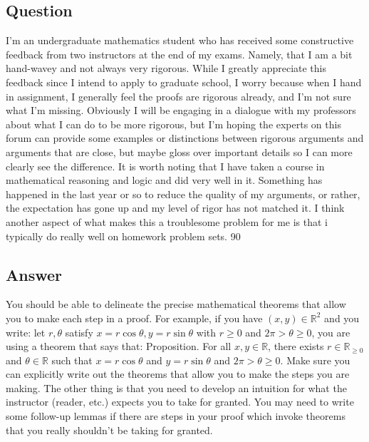 \documentclass{article}
\begin{document}
\subsection*{Question}
I'm an undergraduate mathematics student who has received some constructive feedback from two instructors at the end of my exams. Namely, that I am a bit hand-wavey and not always very rigorous. While I greatly appreciate this feedback since I intend to apply to graduate school, I worry because when I hand in assignment, I generally feel the proofs are rigorous already, and I'm not sure what I'm missing. Obviously I will be engaging in a dialogue with my professors about what I can do to be more rigorous, but I'm hoping the experts on this forum can provide some examples or distinctions between rigorous arguments and arguments that are close, but maybe gloss over important details so I can more clearly see the difference. It is worth noting that I have taken a course in mathematical reasoning and logic and did very well in it. Something has happened in the last year or so to reduce the quality of my arguments, or rather, the expectation has gone up and my level of rigor has not matched it. I think another aspect of what makes this a troublesome problem for me is that i typically do really well on homework problem sets. 90%

\subsection*{Answer}
You should be able to delineate the precise mathematical theorems that allow you to make each step in a proof. For example, if you have $(x,y) \in \mathbb{R}^2$ and you write: let $r,\theta$ satisfy $x = r\cos \theta,y=r\sin \theta$ with $r\geq 0$ and $2\pi > \theta \geq 0$, you are using a theorem that says that: Proposition. For all $x,y \in \mathbb{R}$, there exists $r \in \mathbb{R}_{\geq 0}$ and $\theta \in \mathbb{R}$ such that $x=r\cos \theta$ and $y = r \sin \theta$ and $2\pi > \theta \geq 0$. Make sure you can explicitly write out the theorems that allow you to make the steps you are making. The other thing is that you need to develop an intuition for what the instructor (reader, etc.) expects you to take for granted. You may need to write some follow-up lemmas if there are steps in your proof which invoke theorems that you really shouldn't be taking for granted.
\end{document}
